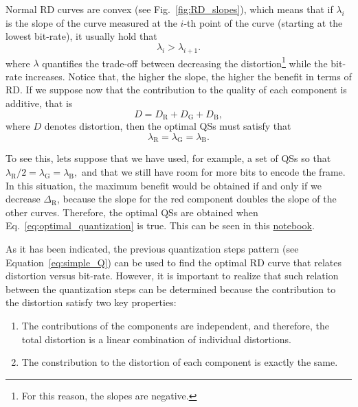 Normal RD curves are convex (see Fig.~\ref{fig:RD_slopes}), which
means that if $\lambda_i$ is the slope of the curve measured at the
$i$-th point of the curve (starting at the lowest bit-rate), it
usually hold that
\begin{equation}
  \lambda_i > \lambda_{i+1}.
\end{equation}
where $\lambda$ quantifies the trade-off between decreasing the
distortion\footnote{For this reason, the slopes are negative.} while
the bit-rate increases. Notice that, the higher the slope, the higher
the benefit in terms of RD. If we suppose now that the contribution to
the quality of each component is additive, that is
\begin{equation}
  D = D_{\text{R}} + D_{\text{G}} + D_{\text{B}},
\end{equation}
where $D$ denotes distortion, then the optimal QSs must satisfy
that~\cite{vetterli1995wavelets,sayood2017introduction}
\begin{equation}
  \lambda_{\text{R}} = \lambda_{\text{G}} = \lambda_{\text{B}}.
  \label{eq:optimal_quantization}
\end{equation}

To see this, lets suppose that we have used, for example, a set of QSs
so that $\lambda_{\text{R}}/2 = \lambda_{\text{G}} =
\lambda_{\text{B}},$ and that we still have room for more bits to
encode the frame. In this situation, the maximum benefit would be
obtained if and only if we decrease $\Delta_{\text{R}}$, because the
slope for the red component doubles the slope of the other
curves. Therefore, the optimal QSs are obtained when
Eq.~\ref{eq:optimal_quantization} is true. This can be seen in this
\href{https://github.com/Sistemas-Multimedia/Sistemas-Multimedia.github.io/blob/master/milestones/05-RGB_quantization/RGB_quantization.ipynb}{notebook}.

As it has been indicated, the previous quantization steps pattern (see
Equation~\ref{eq:simple_Q}) can be used to find the optimal RD curve
that relates distortion versus bit-rate. However, it is important to
realize that such relation between the quantization steps can be
determined because the contribution to the distortion satisfy two key
properties:
\begin{enumerate}
\item The contributions of the components are independent, and
  therefore, the total distortion is a linear combination of
  individual distortions.
\item The constribution to the distortion of each component is exactly
  the same.
\end{enumerate}

